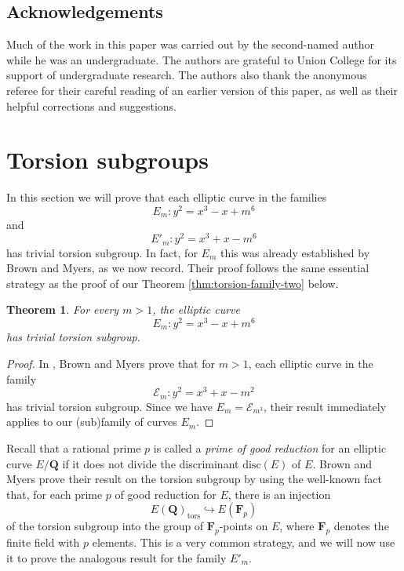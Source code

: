 \documentclass{amsart}
\newtheorem{theorem}{Theorem}[section]
\numberwithin{equation}{section}
\theoremstyle{remark}
\newcommand{\Q}{\mathbf{Q}}
\newcommand{\F}{\mathbf{F}}
\begin{document}
\subsection*{Acknowledgements}
Much of the work in this paper was carried out by the second-named author while he was an undergraduate. The authors are grateful to Union College for its support of undergraduate research. The authors also thank the anonymous referee for their careful reading of an earlier version of this paper, as well as their helpful corrections and suggestions.



\section{Torsion subgroups}\label{sec:torsion}

In this section we will prove that each elliptic curve in the families
\[
E_m \colon y^2= x^3 - x + m^6
\]
and
\[
E'_m \colon y^2=x^3 + x - m^6
\]
has trivial torsion subgroup. In fact, for $E_m$ this was already established by Brown and Myers, as we now record. Their proof follows the same essential strategy as the proof of our Theorem \ref{thm:torsion-family-two} below.

\begin{theorem}\label{thm:torsion-family-one}
For every $m>1$, the elliptic curve
\[
E_m \colon y^2 = x^3 - x + m^6
\]
has trivial torsion subgroup.
\end{theorem}
\begin{proof}
In \cite[Theorem 3]{BrownMyers}, Brown and Myers prove that for $m>1$, each elliptic curve in the family
\begin{equation}\label{eq:brown-myers-family}
\mathcal{E}_m \colon y^2=x^3 + x - m^2
\end{equation}
has trivial torsion subgroup. Since we have $E_m=\mathcal{E}_{m^3}$, their result immediately applies to our (sub)family of curves $E_m$.
\end{proof}

Recall that a rational prime $p$ is called a \textit{prime of good reduction} for an elliptic curve $E/\Q$ if it does not divide the discriminant $\mathrm{disc}(E)$ of $E$. Brown and Myers prove their result on the torsion subgroup by using the well-known fact that, for each prime $p$ of good reduction for $E$, there is an injection
\[
E(\Q)_{\mathrm{tors}} \hookrightarrow E(\F_p)
\]
of the torsion subgroup into the group of $\F_p$-points on $E$, where $\F_p$ denotes the finite field with $p$ elements. This is a very common strategy, and we will now use it to prove the analogous result for the family $E'_m$.
\end{document}
